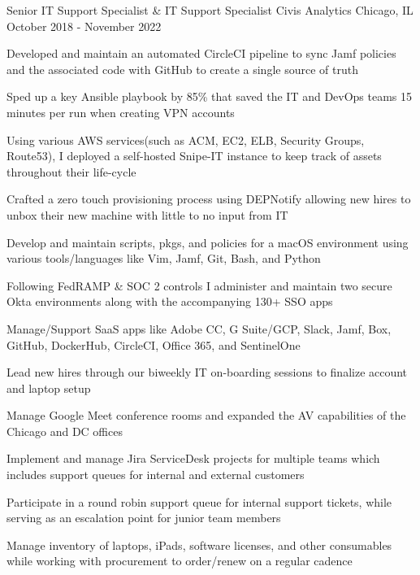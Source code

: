

\begin{cventries}

	\cventry
	{Senior IT Support Specialist \& IT Support Specialist} %
	{Civis Analytics} %
	{Chicago, IL} %
	{October 2018 - November 2022} %
	{
		\begin{cvitems} %
			\item {Developed and maintain an automated CircleCI pipeline to sync Jamf policies and the associated code with GitHub to create a single source of truth}
			\item {Sped up a key Ansible playbook by 85\% that saved the IT and DevOps teams 15 minutes per run when creating VPN accounts}
			\item {Using various AWS services(such as ACM, EC2, ELB, Security Groups, Route53), I deployed a self-hosted Snipe-IT instance to keep track of assets throughout their life-cycle}
			\item {Crafted a zero touch provisioning process using DEPNotify allowing new hires to unbox their new machine with little to no input from IT}
			\item {Develop and maintain scripts, pkgs, and policies for a macOS environment using various tools/languages like Vim, Jamf, Git, Bash, and Python}
			\item {Following FedRAMP \& SOC 2 controls I administer and maintain two secure Okta environments along with the accompanying 130+ SSO apps}
			\item {Manage/Support SaaS apps like Adobe CC, G Suite/GCP, Slack, Jamf, Box, GitHub, DockerHub, CircleCI, Office 365, and SentinelOne}
			\item {Lead new hires through our biweekly IT on-boarding sessions to finalize account and laptop setup}
			\item {Manage Google Meet conference rooms and expanded the AV capabilities of the Chicago and DC offices}
			\item {Implement and manage Jira ServiceDesk projects for multiple teams which includes support queues for internal and external customers}
			\item {Participate in a round robin support queue for internal support tickets, while serving as an escalation point for junior team members}
			\item {Manage inventory of laptops, iPads, software licenses, and other consumables while working with procurement to order/renew on a regular cadence}
		\end{cvitems}
	}


\end{cventries}
